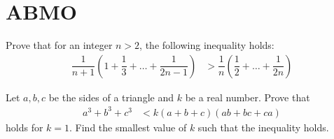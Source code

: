 \documentclass{subfile}
\begin{document}
	\section{ABMO}\label{sec:abmo}
		\begin{problem}
			Prove that for an integer $n>2$, the following inequality holds:
				\begin{align*}
					\dfrac{1}{n+1}\left(1+\dfrac{1}{3}+\ldots+\dfrac{1}{2n-1}\right)
						& > \dfrac{1}{n}\left(\dfrac{1}{2}+\ldots+\dfrac{1}{2n}\right)
				\end{align*}
			
				\begin{solution}
					
				\end{solution}
		\end{problem}
	
		\begin{problem}
			Let $a,b,c$ be the sides of a triangle and $k$ be a real number. Prove that
				\begin{align*}
					a^{3}+b^{3}+c^{3}
						& < k(a+b+c)(ab+bc+ca)
				\end{align*}
			holds for $k=1$. Find the smallest value of $k$ such that the inequality holds.
		\end{problem}
\end{document}
